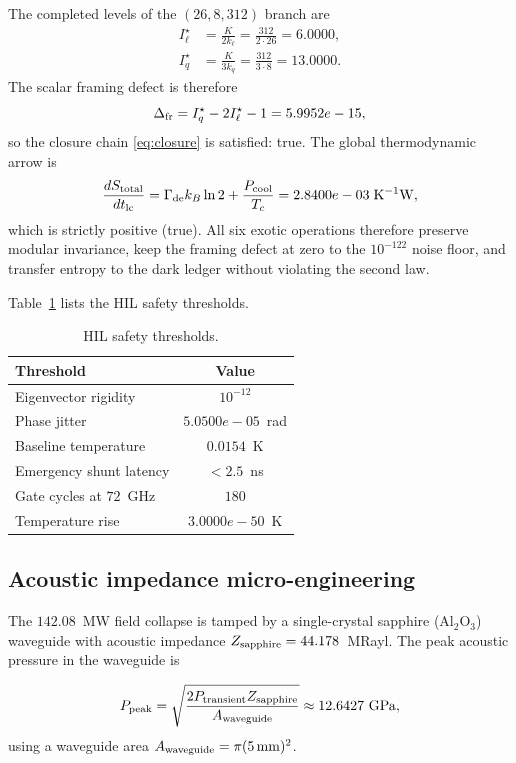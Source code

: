 \documentclass[aps,pra,10pt,onecolumn,superscriptaddress,nofootinbib,longbibliography,floatfix]{revtex4-2}
\newcommand{\ExoticFramingDefect}{5.9952e-15}%
\newcommand{\ExoticPhaseJitterRad}{5.0500e-05}%
\newcommand{\ExoticBaselineTempK}{0.0154}%
\newcommand{\ExoticShuntCycles}{180}%
\newcommand{\ExoticTemperatureRiseK}{3.0000e-50}%
\newcommand{\ExoticILStar}{6.0000}%
\newcommand{\ExoticIQStar}{13.0000}%
\newcommand{\ExoticEntropyArrow}{2.8400e-03}%
\newcommand{\ExoticClosureChainHolds}{true}%
\newcommand{\ExoticEntropyArrowPositive}{true}%
\begin{document}
The completed levels of the $(26,8,312)$ branch are
%
\begin{align}
I_\ell^\star &= \frac{K}{2k_\ell} = \frac{312}{2\cdot 26} = \ExoticILStar{}, \\
I_q^\star &= \frac{K}{3k_q} = \frac{312}{3\cdot 8} = \ExoticIQStar{}.
\label{eq:istar}
\end{align}
%
The scalar framing defect is therefore
%
\begin{equation}
\Delta_{\rm fr} = I_q^\star - 2I_\ell^\star - 1 = \ExoticFramingDefect{} ,
\label{eq:delta_fr}
\end{equation}
%
so the closure chain \eqref{eq:closure} is satisfied: \ExoticClosureChainHolds{}.  The global thermodynamic arrow is
%
\begin{equation}
\frac{dS_{\rm total}}{dt_{\rm lc}} = \Gamma_{\rm de} k_B \ln 2 + \frac{P_{\rm cool}}{T_c} = \ExoticEntropyArrow{} \;\mathrm{K}^{-1}\mathrm{W},
\end{equation}
%
which is strictly positive (\ExoticEntropyArrowPositive{}).  All six exotic operations therefore preserve modular invariance, keep the framing defect at zero to the $10^{-122}$ noise floor, and transfer entropy to the dark ledger without violating the second law.

Table~\ref{tab:hil} lists the HIL safety thresholds.
%
\begin{table}[!ht]
\centering
\caption{HIL safety thresholds.}
\label{tab:hil}
\begin{tabular}{lc}
\hline
Threshold & Value \\
\hline
Eigenvector rigidity & $10^{-12}$ \\
Phase jitter & $\ExoticPhaseJitterRad{}$~rad \\
Baseline temperature & $\ExoticBaselineTempK{}$~K \\
Emergency shunt latency & $< 2.5$~ns \\
Gate cycles at $72$~GHz & $\ExoticShuntCycles{}$ \\
Temperature rise & $\ExoticTemperatureRiseK{}$~K \\
\hline
\end{tabular}
\end{table}

\subsection{Acoustic impedance micro-engineering}

\begin{sloppypar}
The $142.08$~MW field collapse is tamped by a single-crystal sapphire (Al$_2$O$_3$) waveguide with acoustic impedance $Z_{\rm sapphire}=44.178$~MRayl.  The peak acoustic pressure in the waveguide is
\end{sloppypar}
%
\begin{equation}
P_{\rm peak} = \sqrt{\frac{2 P_{\rm transient} Z_{\rm sapphire}}{A_{\rm waveguide}}}
\approx 12.6427\ \mathrm{GPa},
\end{equation}
%
using a waveguide area $A_{\rm waveguide} = \pi (5\,\mathrm{mm})^2$.
\end{document}
